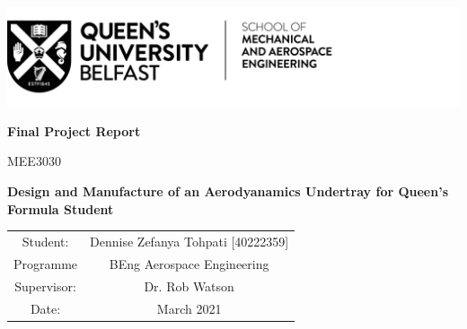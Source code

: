 \begin{titlepage}
\includegraphics[scale=1]{Figures/QUB LOGO - SMAE.png}
\centering

\vspace{3cm}
\textbf{Final Project Report}

MEE3030

\vspace{3cm}
\textbf{Design and Manufacture of an Aerodyanamics Undertray for Queen's Formula Student}


\vspace{7cm}
\begin{tabular}{cc}
    Student: &  \quad Dennise Zefanya Tohpati [40222359]\\
    Programme & \quad BEng Aerospace Engineering\\
    Supervisor: & \quad Dr. Rob Watson\\
    Date: & \quad 16 March 2021
    
    
\end{tabular}
\newpage
\end{titlepage}
